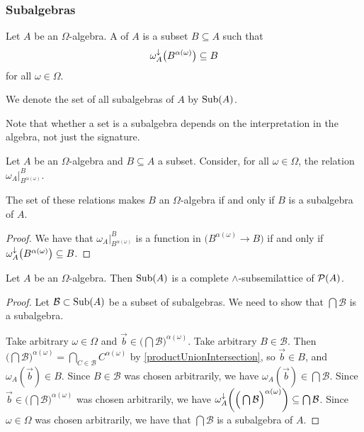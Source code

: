 \subsubsection{Subalgebras}
\begin{definition}
Let $A$ be an $\Omega$-algebra. A  of $A$ is a subset $B\subseteq A$ such that
\[ \omega_A^{\downarrow}\big(B^{\alpha(\omega)}\big) \subseteq B \]
for all $\omega \in \Omega$.

We denote the set of all subalgebras of $A$ by $\operatorname{Sub}(A)$.
\end{definition}
Note that whether a set is a subalgebra depends on the interpretation in the algebra, not just the signature.

\begin{proposition}
Let $A$ be an $\Omega$-algebra and $B\subseteq A$ a subset. Consider, for all $\omega\in \Omega$, the relation $\omega_A|_{B^{\alpha(\omega)}}^B$.

The set of these relations makes $B$ an $\Omega$-algebra \textup{if and only if} $B$ is a subalgebra of $A$.
\end{proposition}
\begin{proof}
We have that $\omega_A|_{B^{\alpha(\omega)}}^B$ is a function in $\big(B^{\alpha(\omega)} \to B\big)$ if and only if $\omega_A^{\downarrow}\big(B^{\alpha(\omega)}\big) \subseteq B$.
\end{proof}

\begin{lemma}
Let $A$ be an $\Omega$-algebra. Then $\operatorname{Sub}(A)$ is a complete $\wedge$-subsemilattice of $\operatorname{\mathcal{P}}(A)$.
\end{lemma}
\begin{proof}
Let $\mathcal{B} \subset \operatorname{Sub}(A)$ be a subset of subalgebras. We need to show that $\bigcap \mathcal{B}$ is a subalgebra.

Take arbitrary $\omega\in \Omega$ and $\vec{b}\in \Big(\bigcap \mathcal{B}\Big)^{\alpha(\omega)}$. Take arbitrary $B\in \mathcal{B}$. Then $\Big(\bigcap \mathcal{B}\Big)^{\alpha(\omega)} = \bigcap_{C\in\mathcal{B}}C^{\alpha(\omega)}$ by \ref{productUnionIntersection}, so $\vec{b}\in B$, and $\omega_A(\vec{b}) \in B$. Since $B\in \mathcal{B}$ was chosen arbitrarily, we have $\omega_A(\vec{b}) \in \bigcap\mathcal{B}$. Since $\vec{b}\in \Big(\bigcap \mathcal{B}\Big)^{\alpha(\omega)}$ was chosen arbitrarily, we have $\omega_A^\downarrow\bigg(\Big(\bigcap \mathcal{B}\Big)^{\alpha(\omega)}\bigg) \subseteq \bigcap\mathcal{B}$. Since $\omega\in\Omega$ was chosen arbitrarily, we have that $\bigcap\mathcal{B}$ is a subalgebra of $A$.
\end{proof}

